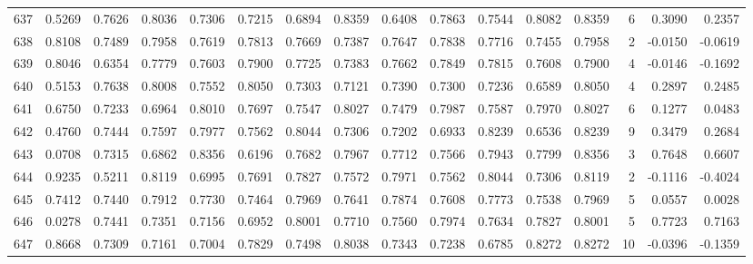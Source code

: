 \begin{tabular}{lrrrrrrrrrrrrrrr}
637 &      0.5269 &  0.7626 &  0.8036 &  0.7306 &  0.7215 &  0.6894 &  0.8359 &  0.6408 &  0.7863 &  0.7544 &   0.8082 &     0.8359 &      6 &                    0.3090 &                     0.2357 \\
638 &      0.8108 &  0.7489 &  0.7958 &  0.7619 &  0.7813 &  0.7669 &  0.7387 &  0.7647 &  0.7838 &  0.7716 &   0.7455 &     0.7958 &      2 &                   -0.0150 &                    -0.0619 \\
639 &      0.8046 &  0.6354 &  0.7779 &  0.7603 &  0.7900 &  0.7725 &  0.7383 &  0.7662 &  0.7849 &  0.7815 &   0.7608 &     0.7900 &      4 &                   -0.0146 &                    -0.1692 \\
640 &      0.5153 &  0.7638 &  0.8008 &  0.7552 &  0.8050 &  0.7303 &  0.7121 &  0.7390 &  0.7300 &  0.7236 &   0.6589 &     0.8050 &      4 &                    0.2897 &                     0.2485 \\
641 &      0.6750 &  0.7233 &  0.6964 &  0.8010 &  0.7697 &  0.7547 &  0.8027 &  0.7479 &  0.7987 &  0.7587 &   0.7970 &     0.8027 &      6 &                    0.1277 &                     0.0483 \\
642 &      0.4760 &  0.7444 &  0.7597 &  0.7977 &  0.7562 &  0.8044 &  0.7306 &  0.7202 &  0.6933 &  0.8239 &   0.6536 &     0.8239 &      9 &                    0.3479 &                     0.2684 \\
643 &      0.0708 &  0.7315 &  0.6862 &  0.8356 &  0.6196 &  0.7682 &  0.7967 &  0.7712 &  0.7566 &  0.7943 &   0.7799 &     0.8356 &      3 &                    0.7648 &                     0.6607 \\
644 &      0.9235 &  0.5211 &  0.8119 &  0.6995 &  0.7691 &  0.7827 &  0.7572 &  0.7971 &  0.7562 &  0.8044 &   0.7306 &     0.8119 &      2 &                   -0.1116 &                    -0.4024 \\
645 &      0.7412 &  0.7440 &  0.7912 &  0.7730 &  0.7464 &  0.7969 &  0.7641 &  0.7874 &  0.7608 &  0.7773 &   0.7538 &     0.7969 &      5 &                    0.0557 &                     0.0028 \\
646 &      0.0278 &  0.7441 &  0.7351 &  0.7156 &  0.6952 &  0.8001 &  0.7710 &  0.7560 &  0.7974 &  0.7634 &   0.7827 &     0.8001 &      5 &                    0.7723 &                     0.7163 \\
647 &      0.8668 &  0.7309 &  0.7161 &  0.7004 &  0.7829 &  0.7498 &  0.8038 &  0.7343 &  0.7238 &  0.6785 &   0.8272 &     0.8272 &     10 &                   -0.0396 &                    -0.1359 \\

\end{tabular}
